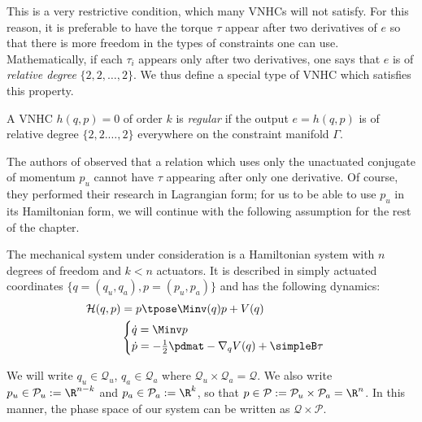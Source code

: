 This is a very restrictive condition, which many VNHCs will not satisfy. For
this reason, it is preferable to have the torque \(\tau\) appear after two 
derivatives of \(e\) so that there is more freedom in the types of constraints
one can use.
Mathematically, if each \(\tau_i\) appears only after two derivatives, one says 
that \(e\) is of \textit{relative degree} \(\{2,2,\ldots,2\}\). 
We thus define a special type of VNHC which satisfies this
property.

\begin{defn}
    A VNHC \(h(q,p) = 0\) of order \(k\) is \textit{regular} if the output 
    \(e = h(q,p)\) is of relative degree \(\{2,2.\ldots,2\}\) everywhere on the
    constraint manifold \(\Gamma\).
\end{defn}

The authors of
\cite{nhvc_dynamic_walking,hybrid_zero_dynamics_bipedal_nhvcs,nhvc_incline_walking}
observed that a relation which uses only the unactuated conjugate of momentum
\(p_u\) cannot have \(\tau\) appearing after only one derivative. Of course,
they performed their research in Lagrangian form; 
for us to be able to use \(p_u\) in its Hamiltonian form, 
we will continue with the following assumption for the rest of the chapter.

\begin{assm}\label{assm:H-is-simply-actuated}
    The mechanical system under consideration is a
    Hamiltonian system with \(n\) degrees of freedom and 
    \(k < n\) actuators. It is described in simply
    actuated coordinates \(\{q = (q_u,q_a), p = (p_u, p_a)\}\) and has the
    following dynamics:
    \begin{align*}
        \mathcal{H}(q,p) &= p\tpose \Minv(q) p + V(q) \\
         &\begin{cases}
            \dot{q} = \Minv p \\
            \dot{p} = -\frac{1}{2} \pdmat - \nabla_q V(q) + \simpleB \tau \\
        \end{cases}
    \end{align*}
\end{assm}
\begin{notation}
    We will write \(q_u \in \mathcal{Q}_u\), \(q_a \in \mathcal{Q}_a\) where
    \(\mathcal{Q}_u \times \mathcal{Q}_a = \mathcal{Q}\). 
    We also write
    \(p_u \in \mathcal{P}_u := \R^{n-k}\) and 
    \(p_a \in \mathcal{P}_a := \R^k\), so that 
    \(p \in \mathcal{P} := \mathcal{P}_u \times \mathcal{P}_a = \R^n\). 
    In this manner, the phase space of our system can be written as
    \(\mathcal{Q} \times \mathcal{P}\).
\end{notation}

